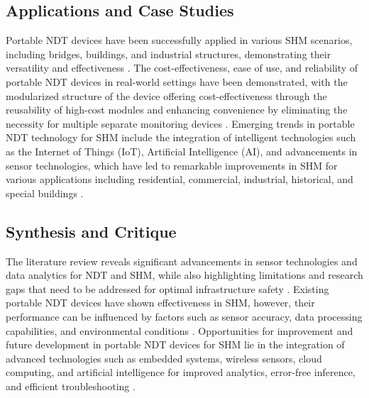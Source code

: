 \documentclass[journal, a4paper]{IEEEtran}
\begin{document}
\subsection{Applications and Case Studies}
Portable NDT devices have been successfully applied in various SHM
scenarios, including bridges, buildings, and industrial structures, demonstrating their versatility and effectiveness \cite{Parsy2018} \cite{Azimi2020}.
The cost-effectiveness, ease of use, and reliability of portable NDT
devices in real-world settings have been demonstrated, with the modularized structure of the device offering
cost-effectiveness through the reusability of high-cost modules and enhancing convenience by eliminating the
necessity for multiple separate monitoring devices \cite{Lee2023}.
Emerging trends in portable NDT technology for SHM
include the integration of intelligent technologies such as the Internet of Things (IoT), Artificial Intelligence (AI),
and advancements in sensor technologies, which have led to remarkable improvements in SHM for various applications
including residential, commercial, industrial, historical, and special buildings \cite{Vijayan2023} \cite{Hassani2023}. 


\subsection{Synthesis and Critique}
The literature review reveals significant advancements in sensor technologies and data analytics
for NDT and SHM,
while also highlighting limitations and research gaps that need to be addressed for optimal infrastructure safety \cite{Vijayan2023} \cite{Hassani2023}.
Existing portable NDT devices have shown effectiveness in SHM,
however, their performance can be influenced by factors such as sensor accuracy, data processing capabilities,
and environmental conditions \cite{Vijayan2023} \cite{Hassani2023}.
Opportunities for improvement and future development in portable NDT devices
for SHM lie in the integration of advanced technologies such as embedded systems,
wireless sensors, cloud computing, and artificial intelligence for improved analytics, error-free inference,
and efficient troubleshooting \cite{Meier2018}.
\end{document}
